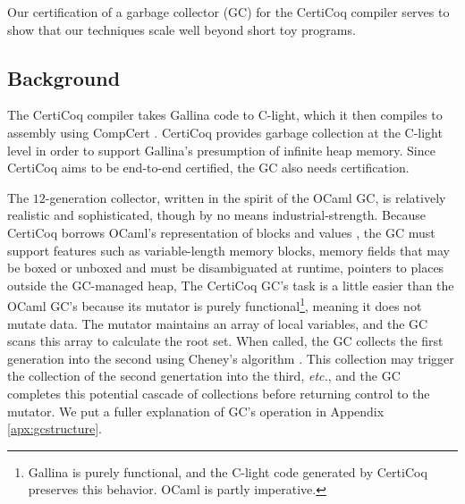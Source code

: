 Our certification of a garbage collector (GC) for the 
CertiCoq compiler serves to show that our techniques 
scale well beyond short toy programs. 


\subsection{Background}
\label{sec:gcbackground}

The CertiCoq compiler \cite{certicoqwebsite} takes Gallina code to 
C-light, which it then compiles to assembly using CompCert \cite{leroy:compcert}.
CertiCoq provides garbage collection at
the C-light level in order to support Gallina's presumption of
infinite heap memory. 
Since CertiCoq aims to be end-to-end certified, the GC 
also needs certification.

The $12$-generation collector, written in the spirit of the OCaml GC, 
is relatively realistic and sophisticated, though by no means 
industrial-strength. 
Because CertiCoq borrows OCaml's representation of blocks and 
values \cite{realworldocaml}, the GC must support features such as 
variable-length memory blocks, memory fields that may be boxed 
or unboxed and must be disambiguated at runtime, pointers to places 
outside the GC-managed heap, 
The CertiCoq GC's task is a little easier than the OCaml GC's because 
its mutator is purely functional\footnote{Gallina is purely functional, and
the C-light code generated by CertiCoq preserves this behavior.
OCaml is partly imperative.},
meaning it does not mutate data. The mutator maintains an array of 
local variables, and the GC scans this array to 
calculate the root set. When called, the GC collects the first generation 
into the second using Cheney's algorithm \cite{cheney:gc}.
This collection may trigger the collection of the second genertation 
into the third, \emph{etc.}, and the GC completes this potential cascade 
of collections before returning control to the mutator. We put a 
fuller explanation of GC's operation in Appendix \ref{apx:gcstructure}.

